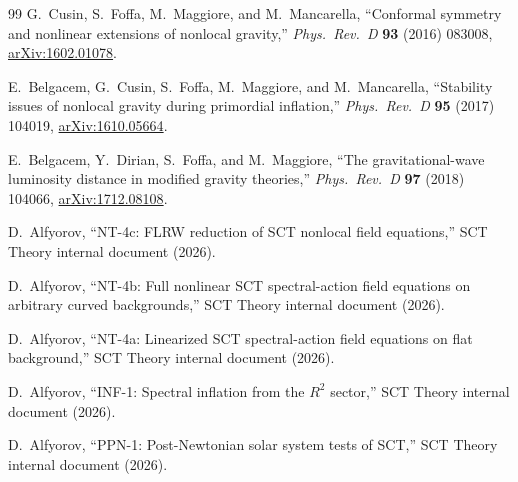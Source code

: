 \documentclass[11pt,a4paper]{article}
\theoremstyle{plain}
\theoremstyle{definition}
\theoremstyle{remark}
\begin{document}
\begin{thebibliography}{99}
G.~Cusin, S.~Foffa, M.~Maggiore, and M.~Mancarella,
``Conformal symmetry and nonlinear extensions of nonlocal gravity,''
\emph{Phys.\ Rev.\ D} \textbf{93} (2016) 083008,
\href{https://arxiv.org/abs/1602.01078}{arXiv:1602.01078}.

E.~Belgacem, G.~Cusin, S.~Foffa, M.~Maggiore, and M.~Mancarella,
``Stability issues of nonlocal gravity during primordial inflation,''
\emph{Phys.\ Rev.\ D} \textbf{95} (2017) 104019,
\href{https://arxiv.org/abs/1610.05664}{arXiv:1610.05664}.

E.~Belgacem, Y.~Dirian, S.~Foffa, and M.~Maggiore,
``The gravitational-wave luminosity distance in modified gravity
theories,''
\emph{Phys.\ Rev.\ D} \textbf{97} (2018) 104066,
\href{https://arxiv.org/abs/1712.08108}{arXiv:1712.08108}.

D.~Alfyorov,
``NT-4c: FLRW reduction of SCT nonlocal field equations,''
SCT Theory internal document (2026).

D.~Alfyorov,
``NT-4b: Full nonlinear SCT spectral-action field equations on
arbitrary curved backgrounds,''
SCT Theory internal document (2026).

D.~Alfyorov,
``NT-4a: Linearized SCT spectral-action field equations on flat
background,''
SCT Theory internal document (2026).

D.~Alfyorov,
``INF-1: Spectral inflation from the $R^2$ sector,''
SCT Theory internal document (2026).

D.~Alfyorov,
``PPN-1: Post-Newtonian solar system tests of SCT,''
SCT Theory internal document (2026).

\end{thebibliography}
\end{document}
